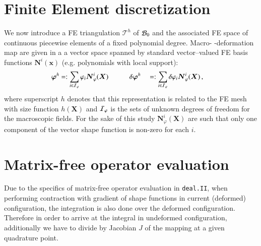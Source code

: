 \documentclass[preprint,12pt,times]{elsarticle}
\def\gz  #1{           \mbox{$\boldsymbol{#1}$}}
\def\mcl  #1{               {\cal #1}}
\begin{document}
\section{Finite Element discretization}

We now introduce a FE triangulation $\mathcal{T}^h$ of $\mcl B_0$ and
the associated FE space of continuous piecewise elements of a fixed polynomial degree. %
Macro- -deformation map are given in a
a vector space spanned by standard vector--valued FE basis functions $\gz N^i(\gz x)$ (e.g. polynomials with local support):
\begin{alignat}{2}
       \gz \varphi^h &=:  \sum_{i \in \mcl I_\varphi}       \varphi_i \gz N^i_\varphi (\gz X) \quad \quad \quad
\delta \gz \varphi^h &&=: \sum_{i \in \mcl I_\varphi} \delta \varphi_i \gz N^i_\varphi (\gz X) \,,
\end{alignat}
where superscript $h$ denotes that this representation is related to the FE mesh with size function $h(\gz X)$ and $\mcl I_\varphi$ is the sets of unknown degrees of freedom for the
macroscopic fields. For the sake of this study $\gz N^i_\varphi (\gz X)$ are such that only one component of the vector shape function is non-zero for each $i$.

\section{Matrix-free operator evaluation}

Due to the specifics of matrix-free operator evaluation in \texttt{deal.II}, when performing contraction with gradient of shape functions in current (deformed) configuration, the integration is also done over the deformed configuration. Therefore in order to arrive at the integral in undeformed configuration, additionally we have to divide by Jacobian $J$ of the mapping at a given quadrature point.
\end{document}
